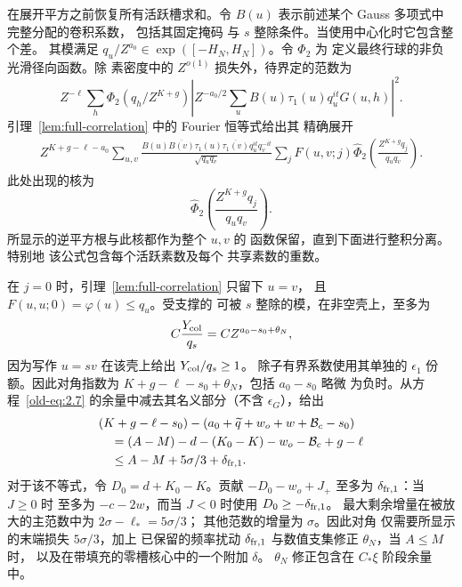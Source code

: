 \documentclass[11pt,a4paper]{article}
\numberwithin{equation}{section}
\numberwithin{figure}{section}
\theoremstyle{definition}
\theoremstyle{remark}
\begin{document}
在展开平方之前恢复所有活跃槽求和。令
\(B(u)\) 表示前述某个 Gauss 多项式中完整分配的卷积系数，
包括其固定掩码
与 \(s\) 整除条件。当使用中心化时它包含整个差。
其模满足
\(q_u/Z^{a_0}\in\exp([-H_N,H_N])\)。令 \(\Phi_2\) 为
定义最终行球的非负光滑径向函数。除
素密度中的 \(Z^{o(1)}\) 损失外，待界定的范数为
\[
 Z^{-\ell}\sum_h\Phi_2(q_h/Z^{K+g})
 \left|Z^{-a_0/2}\sum_u B(u)\tau_1(u)q_u^{it}G(u,h)\right|^2.
\]
引理~\ref{lem:full-correlation} 中的 Fourier 恒等式给出其
精确展开
\[
 \begin{split}
 Z^{K+g-\ell-a_0}\sum_{u,v}
 \frac{B(u)\overline{B(v)}\tau_1(u)\overline{\tau_1(v)}
       q_u^{it}q_v^{-it}}{\sqrt{q_uq_v}}
 \sum_j F(u,v;j)
 \widehat\Phi_2\left(\frac{Z^{K+g}q_j}{q_uq_v}\right).
 \end{split}
\]
此处出现的核为
\begin{equation}
 \widehat\Phi_2\left(\frac{Z^{K+g}q_j}{q_uq_v}\right).
 \label{old-eq:2.18b}
\end{equation}
所显示的逆平方根与此核都作为整个 \(u,v\) 的
函数保留，直到下面进行整积分离。特别地
该公式包含每个活跃素数及每个
共享素数的重数。

在 \(j=0\) 时，引理~\ref{lem:full-correlation} 只留下 \(u=v\)，
且 \(F(u,u;0)=\varphi(u)\le q_u\)。受支撑的
可被 \(s\) 整除的模，在非空壳上，至多为
\[
 C\frac{Y_{\rm col}}{q_s}=C Z^{a_0-s_0+\theta_N},
\]
因为写作 \(u=sv\) 在该壳上给出 \(Y_{\rm col}/q_s\ge1\)。
除子有界系数使用其单独的 \(\epsilon_1\)
份额。因此对角指数为
\(K+g-\ell-s_0+\theta_N\)，包括 \(a_0-s_0\) 略微
为负时。从方程~\eqref{old-eq:2.7}
的余量中减去其名义部分（不含 \(\epsilon_G\)），给出
\begin{equation}
 \begin{split}
 &(K+g-\ell-s_0)
 -(a_0+\widetilde q+w_o+w+\mathcal B_c-s_0)\\
 &\quad=(A-M)-d-(K_0-K)-w_o-\mathcal B_c+g-\ell\\
 &\quad\le A-M+5\sigma/3+\delta_{{\rm fr},1}.
 \end{split}
 \label{old-eq:2.12}
\end{equation}
对于该不等式，令 \(D_0=d+K_0-K\)。贡献
\(-D_0-w_o+J_+\) 至多为 \(\delta_{{\rm fr},1}\)：当 \(J\ge0\) 时
至多为 \(-c-2w\)，而当 \(J<0\) 时使用
\(D_0\ge-\delta_{{\rm fr},1}\)。
最大剩余增量在被放大的主范数中为
\(2\sigma-\ell_*=5\sigma/3\)；
其他范数的增量为 \(\sigma\)。因此对角
仅需要所显示的末端损失 \(5\sigma/3\)，加上
已保留的频率扰动 \(\delta_{{\rm fr},1}\)
与数值支集修正 \(\theta_N\)，当 \(A\le M\) 时，
以及在带填充的零槽核心中的一个附加 \(\delta\)。
\(\theta_N\) 修正包含在 \(C_*\xi\) 阶段余量中。
\end{document}

